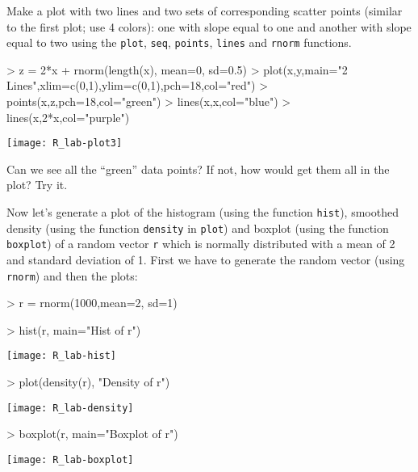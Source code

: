 \documentclass[12pt]{article}
\newcommand{\code}[1]{{\texttt{#1}}}
\begin{document}
Make a plot with two lines and two sets of corresponding scatter points (similar to the first plot; use 4 colors): one with slope equal to one and another with slope equal to two using the \code{plot}, \code{seq}, \code{points}, \code{lines} and \code{rnorm} functions.

\begin{Schunk}
\begin{Sinput}
> z = 2*x + rnorm(length(x), mean=0, sd=0.5)
> plot(x,y,main="2 Lines",xlim=c(0,1),ylim=c(0,1),pch=18,col="red")
> points(x,z,pch=18,col="green")
> lines(x,x,col="blue")
> lines(x,2*x,col="purple")
\end{Sinput}
\end{Schunk}
\texttt{[image: R\_lab-plot3]}

Can we see all the ``green'' data points?  If not, how would get them all in the plot?  Try it.

Now let's generate a plot of the histogram (using the function \code{hist}), smoothed density (using the function \code{density} in \code{plot}) and boxplot (using the function \code{boxplot}) of a random vector \code{r} which is normally distributed with a mean of 2 and standard deviation of 1.  First we have to generate the random vector (using \code{rnorm}) and then the plots:

\begin{Schunk}
\begin{Sinput}
> r = rnorm(1000,mean=2, sd=1)
\end{Sinput}
\end{Schunk}

\begin{Schunk}
\begin{Sinput}
> hist(r, main="Hist of r")
\end{Sinput}
\end{Schunk}
\texttt{[image: R\_lab-hist]}

\begin{Schunk}
\begin{Sinput}
> plot(density(r), "Density of r")
\end{Sinput}
\end{Schunk}
\texttt{[image: R\_lab-density]}

\begin{Schunk}
\begin{Sinput}
> boxplot(r, main="Boxplot of r")
\end{Sinput}
\end{Schunk}
\texttt{[image: R\_lab-boxplot]}
\end{document}
